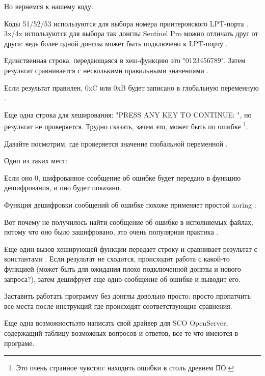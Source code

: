 Но вернемся к нашему коду.

Коды 51/52/53 используются для выбора номера принтеровского LPT-порта
.
3x/4x используются для выбора  так донглы Sentinel Pro
можно отличать друг от друга: ведь более одной донглы может быть подключено к LPT-порту
.

Единственная строка, передающаяся в хеш-функцию это
 "0123456789".
Затем результат сравнивается с несколькими правильными значениями
.

%
Если результат правилен, 0xC или 0xB будет записано в глобальную переменную .

Еще одна строка для хеширования:
"PRESS ANY KEY TO CONTINUE: ", но результат не проверяется.
Трудно сказать, зачем это, может быть по ошибке
\footnote{Это очень странное чувство: находить ошибки в столь древнем ПО.
}.

Давайте посмотрим, где проверяется значение глобальной переменной
 .

Одно из таких мест:



Если оно 0, шифрованное сообщение об ошибке будет передано в функцию дешифрования, и оно будет 
показано.

Функция дешифровки сообщений об ошибке похоже применяет простой \gls{xoring}
:



Вот почему не получилось найти сообщение об ошибке в исполняемых файлах, потому что оно было
зашифровано, это очень популярная практика%
.

Еще один вызов хеширующей функции передает строку
 и сравнивает результат с константами
 \AndENRU {}.
Если результат не сходится, происходит работа с какой-то функцией
(может быть для ожидания плохо подключенной донглы и нового запроса?), затем дешифрует
еще одно сообщение об ошибке и выводит его.



Заставить работать программу без донглы довольно просто: просто пропатчить все места после инструкций
\CMP где происходят соответствующие сравнения.

Еще одна возможность\EMDASH{}это написать свой драйвер для SCO OpenServer, содержащий таблицу возможных вопросов и ответов, все те что имеются в програме.


